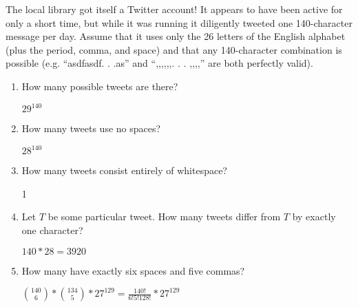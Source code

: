 \question The local library got itself a Twitter account! 
It appears to have been active for only a short time, but while it 
was running it diligently tweeted one 140-character message per day. 
Assume that it uses only the 26 letters of the English alphabet 
(plus the period, comma, and space) and that any 140-character 
combination is possible (e.g. “asdfasdf. . .as” and “,,,,,,. . . ,,,,” 
are both perfectly valid). 

\begin{enumerate}[label=(\alph*)]
\item How many possible tweets are there? 
\begin{solution}
$29^{140}$
\end{solution}

\item How many tweets use no spaces? 
\begin{solution}
$28^{140}$
\end{solution}

\item How many tweets consist entirely of whitespace? 
\begin{solution}
1
\end{solution}

\item Let $T$ be some particular tweet. How many tweets differ from $T$ by exactly one character? 
\begin{solution}
$140*28 = 3920$
\end{solution}

\item How many have exactly six spaces and five commas? 
\begin{solution}[1 cm]
${140 \choose 6} * {134 \choose 5} * 27^{129} = 
\frac{140!}{6!5!128!} * 27^{129}$
\end{solution}
\end{enumerate}